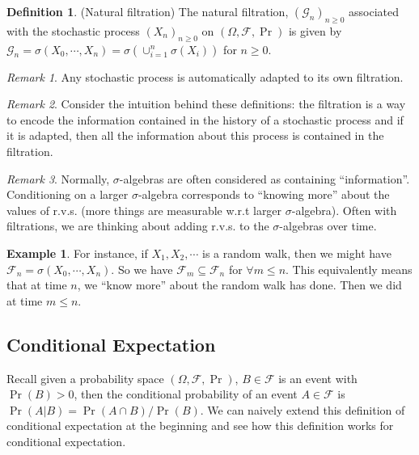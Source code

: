 \documentclass[a4paper,11pt]{report}
\theoremstyle{plain} %
\theoremstyle{definition} %
\newtheorem{defn}[thm]{Definition}
\newtheorem{eg}[thm]{Example}
\theoremstyle{remark} %
\newtheorem*{rem}{Remark}
\begin{document}
\begin{defn}(Natural filtration) The natural filtration,  $(\mathcal{G}_{n})_{n\geq 0}$ associated with the stochastic process $(X_{n})_{n\geq 0}$ on $(\Omega, \mathcal{F},\Pr)$ is given by $\mathcal{G}_{n}=\sigma (X_{0},\cdots ,X_{n} )= \sigma (\cup_{i=1}^n \sigma (X_{i}))$ for $n\geq 0$.

\end{defn}

\begin{rem} Any stochastic process is automatically adapted to its own filtration.

\end{rem}

\begin{rem} Consider the intuition behind these definitions: the filtration is a way to encode the information contained in the history of a stochastic process and if it is adapted, then all the information about this process is contained in the filtration. 
\end{rem}

\begin{rem} Normally, $\sigma$-algebras are often considered as containing ``information''. Conditioning on a larger $\sigma$-algebra corresponds to ``knowing more'' about the values of r.v.s. (more things are measurable w.r.t larger $\sigma$-algebra). Often with filtrations, we are thinking about adding r.v.s. to the $\sigma$-algebras over time.

\end{rem}

\begin{eg}For instance, if $X_{1}, X_{2}, \cdots$ is a random walk, then we might have $\mathcal{F}_{n}=\sigma (X_{0},\cdots ,X_{n})$. So we have $\mathcal{F}_{m}\subseteq \mathcal{F}_{n}$ for $\forall m\leq n$. This equivalently means that at time $n$, we ``know more'' about the random walk has done. Then we did at time $m\leq n$.

\end{eg}

\subsection{Conditional Expectation}
\par Recall given a probability space $(\Omega, \mathcal{F},\Pr)$, $B\in \mathcal{F}$ is an event with $\Pr(B) >0$, then the conditional probability of an event $A\in \mathcal{F}$ is $\Pr(A|B)=\Pr (A\cap B)/ \Pr (B)$. We can naively extend this definition of conditional expectation at the beginning and see how this definition works for conditional expectation.
\end{document}
